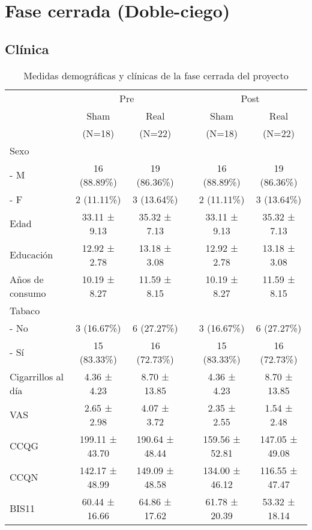 \section{Fase cerrada (Doble-ciego)}
\subsection{Clínica}

\begin{table}[!ht]
    \small
    \caption{Medidas demográficas y clínicas de la fase cerrada del proyecto}
    \label{tab:demT}
    \centering
    \begin{tabular}{lccccc}
        \hline
 & \multicolumn{2}{c}{Pre}  &  &\multicolumn{2}{c}{Post} \\
 \cline{2-4}\cline{5-6}
 & Sham & Real & & Sham & Real\\
 & (N=18) & (N=22) &  & (N=18) & (N=22) \\
 \hline
        Sexo            &  &  & &  &  \\
        - M           & 16 (88.89\%) & 19 (86.36\%) &  & 16 (88.89\%) & 19 (86.36\%) \\
        - F           & 2 (11.11\%) & 3 (13.64\%) &  & 2 (11.11\%) & 3 (13.64\%) \\
        Edad            & 33.11 ± 9.13 & 35.32 ± 7.13  &  & 33.11 ± 9.13 & 35.32 ± 7.13 \\
        Educación       & 12.92 ± 2.78 & 13.18 ± 3.08  &  & 12.92 ± 2.78 & 13.18 ± 3.08 \\
        Años de consumo    & 10.19 ± 8.27 & 11.59 ± 8.15  &  & 10.19 ± 8.27 & 11.59 ± 8.15 \\
        Tabaco          &  &   &  &  &   \\
        - No          & 3 (16.67\%) & 6 (27.27\%)  &  & 3 (16.67\%) & 6 (27.27\%)  \\
        - Sí          & 15 (83.33\%) & 16 (72.73\%)  &  & 15 (83.33\%) & 16 (72.73\%) \\
        Cigarrillos al día & 4.36 ± 4.23 & 8.70 ± 13.85  &  & 4.36 ± 4.23 & 8.70 ± 13.85 \\
        \hline
        VAS             & 2.65 ± 2.98 & 4.07 ± 3.72 &  & 2.35 ± 2.55 & 1.54 ± 2.48 \\
        CCQG            & 199.11 ± 43.70 & 190.64 ± 48.44  &  & 159.56 ± 52.81 & 147.05 ± 49.08 \\
        CCQN            & 142.17 ± 48.99 & 149.09 ± 48.58  &  & 134.00 ± 46.12 & 116.55 ± 47.47  \\
        BIS11           & 60.44 ± 16.66 & 64.86 ± 17.62 &  & 61.78 ± 20.39 & 53.32 ± 18.14 \\
        \hline
    \end{tabular}
\end{table}

